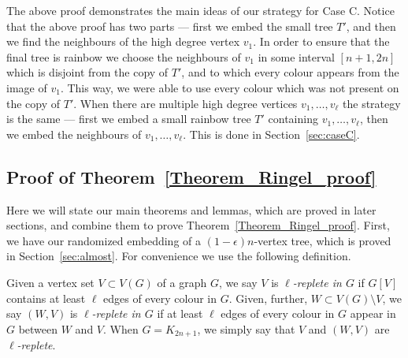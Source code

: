 The above proof demonstrates the main ideas of our strategy for Case C. Notice that the above proof has two parts --- first we embed the small tree $T'$, and then we find the neighbours of the high degree vertex $v_1$. In order to ensure that the final tree is rainbow we choose the neighbours of $v_1$ in some interval $[n+1, 2n]$ which is disjoint from the copy of $T'$, and to which every colour appears from the image of $v_1$. This way, we were able to use every colour which was not present on the copy of $T'$.
When there are multiple high degree vertices $v_1, \dots, v_{\ell}$ the strategy is the same --- first we embed a small rainbow tree $T'$ containing $v_1, \dots, v_{\ell}$, then we embed the neighbours of $v_1, \dots, v_{\ell}$. This is done in Section~\ref{sec:caseC}.  



\subsection{Proof of Theorem~\ref{Theorem_Ringel_proof}}\label{sec:overhead}
Here we will state our main theorems and lemmas, which are proved in later sections, and combine them to prove Theorem~\ref{Theorem_Ringel_proof}. First, we have our randomized embedding of a $(1-\epsilon)n$-vertex tree, which is proved in Section~\ref{sec:almost}. For convenience we use the following definition.

\begin{definition}
Given a vertex set $V\subset V(G)$ of a graph $G$, we say $V$ is \emph{$\ell$-replete in $G$} if $G[V]$ contains at least $\ell$ edges of every colour in $G$. Given, further, $W\subset V(G)\setminus V$, we say $(W,V)$ is \emph{$\ell$-replete in $G$} if at least $\ell$ edges of every colour in $G$ appear in $G$ between $W$ and $V$. When $G=K_{2n+1}$, we simply say that $V$ and $(W,V)$ are \emph{$\ell$-replete}.
\end{definition}


